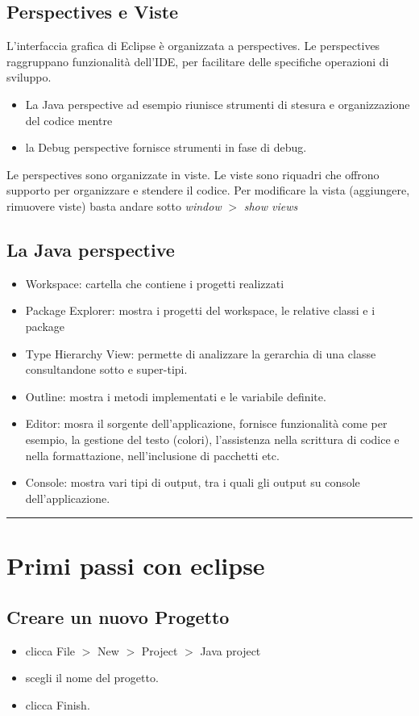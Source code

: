\documentclass{article}
\begin{document}
\subsection{Perspectives e Viste}
L'interfaccia grafica di Eclipse \`e organizzata a  perspectives. Le perspectives raggruppano funzionalità dell'IDE, per facilitare delle specifiche  operazioni di sviluppo. 
\begin{itemize}
\item La Java perspective ad esempio riunisce strumenti di stesura e organizzazione 
del codice mentre 
\item la Debug perspective fornisce strumenti in fase di debug.
\end{itemize}
Le perspectives sono organizzate in viste. Le viste sono riquadri che offrono supporto per organizzare e stendere il codice. Per modificare la vista (aggiungere, rimuovere viste) basta andare sotto 
\textit{window} $>$ \textit{show views}

\subsection{La Java perspective}
\begin{itemize}
\item Workspace: cartella che contiene i progetti realizzati
\item Package Explorer: mostra i progetti del workspace, le relative classi e i package 
\item Type Hierarchy View: permette di analizzare la gerarchia di una classe consultandone sotto e super-tipi.
\item Outline: mostra i metodi  implementati e le variabile  definite.
\item Editor: mosra il sorgente dell'applicazione, fornisce funzionalit\` a come per esempio, la gestione del testo (colori), l'assistenza nella scrittura di codice e nella formattazione, nell'inclusione di pacchetti etc.
\item Console: mostra vari tipi di output, tra i quali gli output su console dell'applicazione.
\end{itemize}

\hrule
\section{Primi passi con eclipse}
\subsection{Creare un nuovo Progetto}
\begin{itemize}
\item clicca File $>$ New $>$ Project $>$ Java project
\item scegli il nome del progetto.
\item clicca Finish.
\end{itemize}
\end{document}
